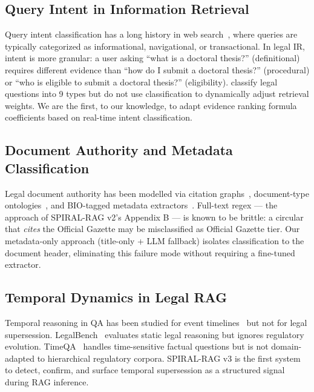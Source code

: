 \documentclass[12pt,a4paper]{article}
\begin{document}
\subsection{Query Intent in Information Retrieval}

Query intent classification has a long history in web search~\cite{broder2002web},
where queries are typically categorized as informational, navigational, or transactional.
In legal IR, intent is more granular: a user asking ``what is a doctoral thesis?''
(definitional) requires different evidence than ``how do I submit a doctoral thesis?''
(procedural) or ``who is eligible to submit a doctoral thesis?'' (eligibility).
\citet{zhong2020nlp4le} classify legal questions into 9 types but do not use
classification to dynamically adjust retrieval weights. We are the first, to our
knowledge, to adapt evidence ranking formula coefficients based on real-time intent
classification.

\subsection{Document Authority and Metadata Classification}

Legal document authority has been modelled via citation graphs~\cite{liet2022legal},
document-type ontologies~\cite{palmirani2011akoma}, and BIO-tagged metadata
extractors~\cite{elwany2019bert}. Full-text regex — the approach of SPIRAL-RAG
v2's Appendix B — is known to be brittle: a circular that \emph{cites} the
Official Gazette may be misclassified as Official Gazette tier. Our metadata-only
approach (title-only + LLM fallback) isolates classification to the document
header, eliminating this failure mode without requiring a fine-tuned extractor.

\subsection{Temporal Dynamics in Legal RAG}

Temporal reasoning in QA has been studied for event timelines~\cite{ning2018temporal}
but not for legal supersession. LegalBench~\cite{guha2023legalbench} evaluates
static legal reasoning but ignores regulatory evolution. TimeQA~\cite{chen2021timeqa}
handles time-sensitive factual questions but is not domain-adapted to hierarchical
regulatory corpora. SPIRAL-RAG v3 is the first system to detect, confirm, and
surface temporal supersession as a structured signal during RAG inference.
\end{document}
